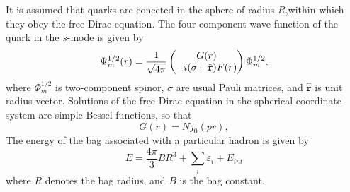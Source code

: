 \documentclass[12pt,epsf]{article}
\begin{document}
\begin{multicols}{2}
It is assumed that quarks are conected in the sphere of radius \(R\),within which they obey the free Dirac equation. The four-component wave function of the quark in the \(s\)-mode is given by
\begin{equation}
  \Psi^{1/2}_m(r)=\frac{1}{\sqrt{4\pi}} 
 \begin{pmatrix} 
 G(r)\\-i(\sigma\cdot\ \hat{\mathtt{r}})F(r)
 \end{pmatrix}\\
 \Phi^{1/2}_m {\tiny{,}}
\end{equation}
where \(\Phi^{1/2}_m\) is two-component spinor, \(\sigma\) are usual Pauli matrices, and \(\hat{\mathtt{r}}\) is unit radius-vector. Solutions of the free Dirac equation in the spherical coordinate system are simple Bessel functions, so that
\begin{equation}
G(r)=Nj_0(pr) ,
\end{equation}
The energy of the bag associated with a particular hadron is given by
\begin{equation}
E=\frac{4\pi}{3}BR^3+ \sum\limits_{i} \varepsilon_i +E_{int}
\end{equation}
where \(R\) denotes the bag radius, and \(B\) is the bag constant. 
\end{multicols}%
\restoregeometry%
\end{document}
